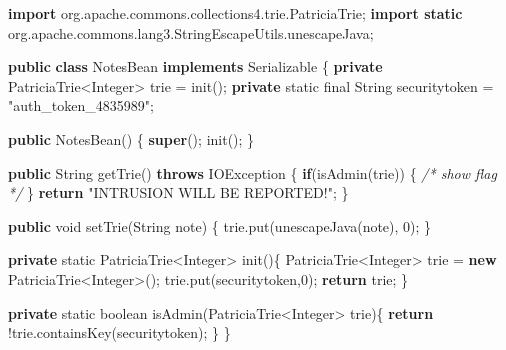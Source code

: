 \documentclass[11pt]{article}
\newenvironment{Shaded}{}{}
\newcommand{\KeywordTok}[1]{\textcolor[rgb]{0.00,0.44,0.13}{\textbf{{#1}}}}
\newcommand{\DataTypeTok}[1]{\textcolor[rgb]{0.56,0.13,0.00}{{#1}}}
\newcommand{\DecValTok}[1]{\textcolor[rgb]{0.25,0.63,0.44}{{#1}}}
\newcommand{\StringTok}[1]{\textcolor[rgb]{0.25,0.44,0.63}{{#1}}}
\newcommand{\CommentTok}[1]{\textcolor[rgb]{0.38,0.63,0.69}{\textit{{#1}}}}
\newcommand{\FunctionTok}[1]{\textcolor[rgb]{0.02,0.16,0.49}{{#1}}}
\newcommand{\NormalTok}[1]{{#1}}
\newcommand{\ImportTok}[1]{{#1}}
\newcommand{\BuiltInTok}[1]{{#1}}
\begin{document}
\begin{Shaded}
\begin{Highlighting}[]
\KeywordTok{import}\ImportTok{ org.apache.commons.collections4.trie.PatriciaTrie;}
\KeywordTok{import static}\ImportTok{ org.apache.commons.lang3.StringEscapeUtils.unescapeJava;}

\KeywordTok{public} \KeywordTok{class}\NormalTok{ NotesBean }\KeywordTok{implements} \BuiltInTok{Serializable}\NormalTok{ \{}
    \KeywordTok{private}\NormalTok{ PatriciaTrie<}\BuiltInTok{Integer}\NormalTok{> trie = }\FunctionTok{init}\NormalTok{();}
    \KeywordTok{private} \DataTypeTok{static} \DataTypeTok{final} \BuiltInTok{String}\NormalTok{ securitytoken = }\StringTok{"auth\_token\_4835989"}\NormalTok{;}

    \KeywordTok{public} \FunctionTok{NotesBean}\NormalTok{() \{}
        \KeywordTok{super}\NormalTok{();}
        \FunctionTok{init}\NormalTok{();}
\NormalTok{    \}}

    \KeywordTok{public} \BuiltInTok{String} \FunctionTok{getTrie}\NormalTok{() }\KeywordTok{throws} \BuiltInTok{IOException}\NormalTok{ \{}
        \KeywordTok{if}\NormalTok{(}\FunctionTok{isAdmin}\NormalTok{(trie)) \{ }\CommentTok{/* show flag */}\NormalTok{ \}}
        \KeywordTok{return} \StringTok{"INTRUSION WILL BE REPORTED!"}\NormalTok{;}
\NormalTok{    \}}

    \KeywordTok{public} \DataTypeTok{void} \FunctionTok{setTrie}\NormalTok{(}\BuiltInTok{String}\NormalTok{ note) \{}
\NormalTok{        trie.}\FunctionTok{put}\NormalTok{(}\FunctionTok{unescapeJava}\NormalTok{(note), }\DecValTok{0}\NormalTok{);}
\NormalTok{    \}}
        
    \KeywordTok{private} \DataTypeTok{static}\NormalTok{ PatriciaTrie<}\BuiltInTok{Integer}\NormalTok{> }\FunctionTok{init}\NormalTok{()\{}
\NormalTok{        PatriciaTrie<}\BuiltInTok{Integer}\NormalTok{> trie = }\KeywordTok{new}\NormalTok{ PatriciaTrie<}\BuiltInTok{Integer}\NormalTok{>();}
\NormalTok{        trie.}\FunctionTok{put}\NormalTok{(securitytoken,}\DecValTok{0}\NormalTok{);}
        \KeywordTok{return}\NormalTok{ trie;}
\NormalTok{    \}}

    \KeywordTok{private} \DataTypeTok{static} \DataTypeTok{boolean} \FunctionTok{isAdmin}\NormalTok{(PatriciaTrie<}\BuiltInTok{Integer}\NormalTok{> trie)\{}
        \KeywordTok{return}\NormalTok{ !trie.}\FunctionTok{containsKey}\NormalTok{(securitytoken);}
\NormalTok{    \}}
\NormalTok{\}}
\end{Highlighting}
\end{Shaded}
\end{document}

